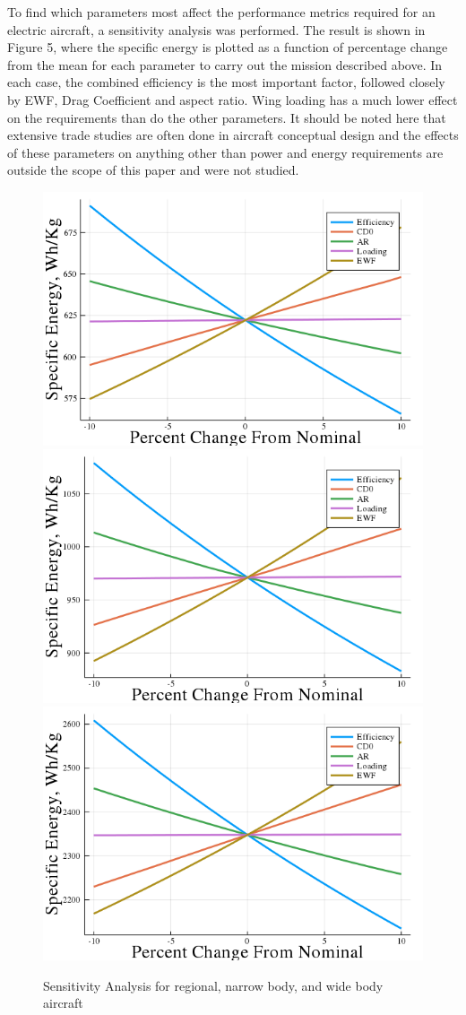 \documentclass{achemso}
\begin{document}
To find which parameters most affect the performance metrics required for an electric aircraft, a sensitivity analysis was performed. The result is shown in Figure 5, where the specific energy is plotted as a function of percentage change from the mean for each parameter to carry out the mission described above.  In each case, the combined efficiency is the most important factor, followed closely by EWF, Drag Coefficient and aspect ratio. Wing loading has a much lower effect on the requirements than do the other parameters. It should be noted here that extensive trade studies are often done in aircraft conceptual design and the effects of these parameters on anything other than power and energy requirements are outside the scope of this paper and were not studied.
\begin{figure}[htp]

\centering
\includegraphics[width=.3\textwidth]{Figures/RJ_Sensitivity.png}\hfill
\includegraphics[width=.3\textwidth]{Figures/NB_Sensitivity.png}\hfill
\includegraphics[width=.3\textwidth]{Figures/WB_Sensitivity.png}

\caption{Sensitivity Analysis for regional, narrow body, and wide body aircraft}
\label{fig:figure5}

\end{figure}
\end{document}
